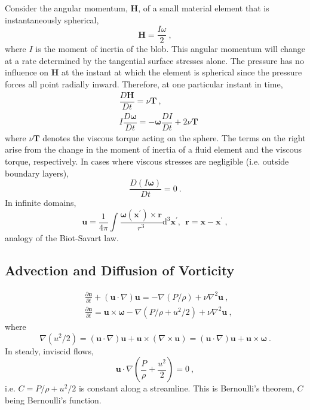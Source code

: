 \documentclass[12pt,a4paper]{article}
\renewcommand{\vec}[1]{\boldsymbol{#1}}
\newcommand{\dif}{\mathrm{d}}
\newcounter{theo}[section]\setcounter{theo}{0}
\begin{document}
Consider the angular momentum, $\vec{H}$, of a small material element that is instantaneously spherical,
\begin{equation}
\vec{H} =  \frac{I \omega}{2} ~,
\end{equation}
where $I$ is the moment of inertia of the blob. This angular momentum will change at a rate determined by the tangential surface stresses alone. The pressure has no influence on $\vec{H}$ at the instant at which the element is spherical since the pressure forces all point radially inward. Therefore, at one particular instant in time, 
\begin{align}
& \dfrac{D \vec{H}}{D t} = \nu \vec{T}  ~, \\
& I \dfrac{D \vec{\omega}}{D t} = -\vec{\omega} \dfrac{D I}{D t} + 2\nu  \vec{T}
\end{align}
where $\nu \vec{T}$ denotes the viscous torque acting on the sphere. The terms on the right arise from the change in the moment of inertia of a fluid element and the viscous torque, respectively. In cases where viscous stresses are negligible (i.e. outside boundary layers),
\begin{equation}
\dfrac{D (I\vec{\omega})}{D t} = 0 ~.
\end{equation}
In infinite domains, 
\begin{equation}
\vec{u} = \frac{1}{4\pi} \int \frac{\vec{\omega}(\vec{x}^\prime) \times \vec{r} }{r^3} \dif^3 \vec{x}^\prime, ~~ \vec{r} = \vec{x} - \vec{x}^\prime ~,
\end{equation}
analogy of the Biot-Savart law. 

\subsection{Advection and Diffusion of Vorticity}
\begin{align}
\nonumber & \frac{\partial \vec{u}}{\partial t} +(\vec{u}\cdot \nabla)\vec{u} = -\nabla (P/\rho) +\nu \nabla^2 \vec{u} ~, \\
& \frac{\partial \vec{u}}{\partial t} = \vec{u}\times \vec{\omega} -\nabla(P/\rho +u^2/2) +\nu \nabla^2 \vec{u} ~,
\end{align}
where
\begin{equation*}
\nabla(u^2/2) = (\vec{u}\cdot \nabla)\vec{u} +\vec{u}\times (\nabla \times \vec{u}) =  (\vec{u}\cdot \nabla)\vec{u} +\vec{u} \times \vec{\omega}  ~.
\end{equation*}
In steady, inviscid flows, 
\begin{equation}
\vec{u} \cdot \nabla \left(\frac{P}{\rho} + \frac{u^2}{2} \right) = 0 ~,
\end{equation}
i.e. $C = P/\rho +u^2/2$ is constant along a streamline. This is Bernoulli's theorem, $C$ being Bernoulli's function.
\end{document}
